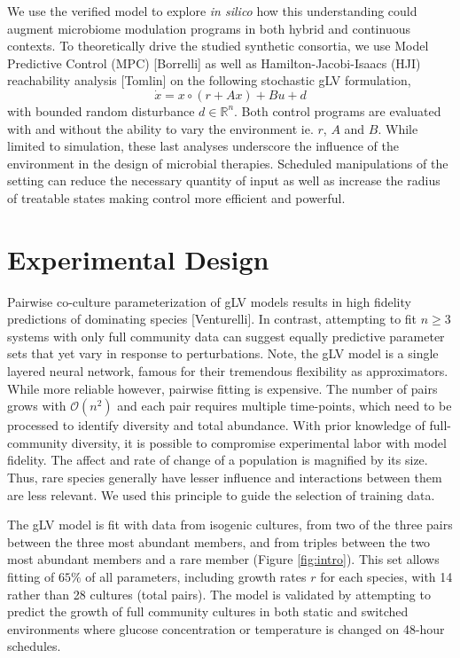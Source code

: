 \documentclass[twocolumn, 10pt]{report}
\begin{document}
{We use the verified model to explore \textit{in silico} how this understanding could augment microbiome modulation programs in both hybrid and continuous contexts. To theoretically drive the studied synthetic consortia, we use Model Predictive Control (MPC) [Borrelli] as well as Hamilton-Jacobi-Isaacs (HJI) reachability analysis [Tomlin] on the following stochastic gLV formulation,
\begin{equation} \label{ctrl_dist_gLV}
    \dot{x} = x \circ (r + Ax) + Bu + d
\end{equation}
with bounded random disturbance $d \in \mathbb{R}^n$. Both control programs are evaluated
with and without the ability to vary the environment ie. $r$, $A$ and $B$. While limited to simulation, these last analyses underscore the influence of the environment in the design of microbial therapies. Scheduled manipulations of the setting can reduce the necessary quantity of input as well as increase the radius of treatable states making control more efficient and powerful.

\section*{Experimental Design}

\indent \indent Pairwise co-culture parameterization of gLV models results in high fidelity predictions of dominating species [Venturelli]. In contrast, attempting to fit $n \geq 3$ systems with only full community data can suggest equally predictive parameter sets that yet vary in response to perturbations. Note, the gLV model is a single layered neural network, famous for their tremendous flexibility as approximators. While more reliable however, pairwise fitting is expensive. The number of pairs grows with $\mathcal{O}(n^2)$ and each pair requires multiple time-points, which need to be processed to identify diversity and total abundance. With prior knowledge of full-community diversity, it is possible to compromise experimental labor with model fidelity. The affect and rate of change of a population is magnified by its size. Thus, rare species generally have lesser influence and interactions between them are less relevant. We used this principle to guide the selection of training data.

The gLV model is fit with data from isogenic cultures, from two of the three pairs between the three most abundant members, and from triples between the two most abundant members and a rare member (Figure \ref{fig:intro}). This set allows fitting of $65\%$ of all parameters, including growth rates $r$ for each species, with 14 rather than 28 cultures (total pairs). The model is validated by attempting to predict the growth of full community cultures in both static and switched environments where glucose concentration or temperature is changed on 48-hour schedules. 

}
\end{document}
